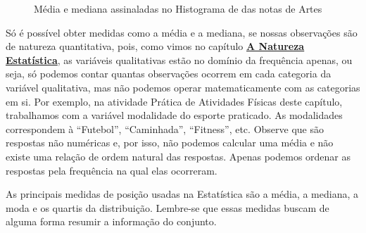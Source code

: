 \begin{figure}[H]
\centering
\capstart

\caption{Média e mediana assinaladas no Histograma de das notas de Artes}\label{\detokenize{PE104-1:fig-coloque-aqui-o-nome}}\label{\detokenize{PE104-1:id6}}\end{figure}

Só é possível obter medidas como a média e a mediana, se nossas observações são de natureza quantitativa, pois, como vimos no capítulo
\textbf{\hyperref[est1-chap]{A Natureza Estatística}}, as variáveis qualitativas estão no domínio da frequência apenas, ou seja, só podemos contar quantas observações ocorrem em cada categoria da variável qualitativa, mas não podemos operar matematicamente com as categorias em si. Por exemplo, na atividade Prática de Atividades Físicas deste capítulo, trabalhamos com a variável modalidade do esporte praticado. As modalidades correspondem à “Futebol”, “Caminhada”, “Fitness”, etc. Observe que são respostas não numéricas e, por isso, não podemos calcular uma média e não existe uma relação de ordem natural das respostas. Apenas podemos ordenar as respostas pela frequência na qual elas ocorreram.

As principais medidas de posição usadas na Estatística são a média, a mediana, a moda e os quartis da distribuição. Lembre-se que essas medidas buscam de alguma forma resumir a informação do conjunto.

